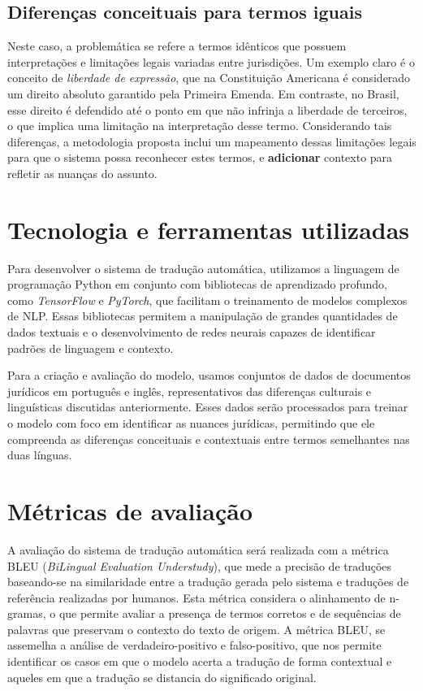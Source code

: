 
\subsection{Diferenças conceituais para termos iguais}

Neste caso, a problemática se refere a termos idênticos que possuem interpretações e limitações legais variadas entre jurisdições. Um exemplo claro é o conceito de \textit{liberdade de expressão}, que na Constituição Americana é considerado um direito absoluto garantido pela Primeira Emenda. Em contraste, no Brasil, esse direito é defendido até o ponto em que não infrinja a liberdade de terceiros, o que implica uma limitação na interpretação desse termo. Considerando tais diferenças, a metodologia proposta inclui um mapeamento dessas limitações legais para que o sistema possa reconhecer estes termos, e \textbf{adicionar} contexto para refletir as nuanças do assunto.

\section{Tecnologia e ferramentas utilizadas}

Para desenvolver o sistema de tradução automática, utilizamos a linguagem de programação Python em conjunto com bibliotecas de aprendizado profundo, como \textit{TensorFlow} e \textit{PyTorch}, que facilitam o treinamento de modelos complexos de NLP. Essas bibliotecas permitem a manipulação de grandes quantidades de dados textuais e o desenvolvimento de redes neurais capazes de identificar padrões de linguagem e contexto.

Para a criação e avaliação do modelo, usamos conjuntos de dados de documentos jurídicos em português e inglês, representativos das diferenças culturais e linguísticas discutidas anteriormente. Esses dados serão processados para treinar o modelo com foco em identificar as nuances jurídicas, permitindo que ele compreenda as diferenças conceituais e contextuais entre termos semelhantes nas duas línguas.

\section{Métricas de avaliação}

A avaliação do sistema de tradução automática será realizada com a métrica BLEU (\textit{BiLingual Evaluation Understudy}), que mede a precisão de traduções baseando-se na similaridade entre a tradução gerada pelo sistema e traduções de referência realizadas por humanos. Esta métrica considera o alinhamento de n-gramas, o que permite avaliar a presença de termos corretos e de sequências de palavras que preservam o contexto do texto de origem. A métrica BLEU, se assemelha a análise de verdadeiro-positivo e falso-positivo, que nos permite identificar os casos em que o modelo acerta a tradução de forma contextual e aqueles em que a tradução se distancia do significado original.

